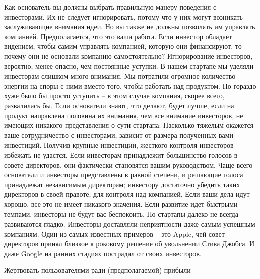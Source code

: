 \documentclass[ebook,12pt,oneside,openany]{memoir}
\begin{document}
Как основатель вы должны выбрать правильную манеру поведения с
инвесторами. Их не следует игнорировать, потому что у них могут
возникать заслуживающие внимания идеи. Но вы также не должны позволять
им управлять компанией. Предполагается, что это ваша работа. Если
инвестор обладает видением, чтобы самим управлять компанией, которую
они финансируют, то почему они не основали компанию самостоятельно?
Игнорирование инвесторов, вероятно, менее опасно, чем постоянные
уступки. В нашем стартапе мы уделяли инвесторам слишком много
внимания. Мы потратили огромное количество энергии на споры с ними
вместо того, чтобы работать над продуктом. Но гораздо хуже было бы
просто уступить – в этом случае компания, скорее всего, развалилась
бы. Если основатели знают, что делают, будет лучше, если на продукт
направлена половина их внимания, чем все внимание инвесторов, не
имеющих никакого представления о сути стартапа. Насколько тяжелым
окажется ваше сотрудничество с инвесторами, зависит от размера
полученных вами инвестиций. Получив крупные инвестиции, жесткого
контроля инвесторов избежать не удастся. Если инвесторам принадлежит
большинство голосов в совете директоров, они фактически становятся
вашим руководством. Чаще всего основатели и инвесторы представлены в
равной степени, и решающие голоса принадлежат независимым директорам;
инвестору достаточно убедить таких директоров в своей правоте, для
контроля над компанией. Если ваши дела идут хорошо, все это не имеет
никакого значения. Если развитие идет быстрыми темпами, инвесторы не
будут вас беспокоить. Но стартапы далеко не всегда развиваются гладко.
Инвесторы доставляли неприятности даже самым успешным компаниям. Один
из самых известных примеров – это Apple, чей совет директоров принял
близкое к роковому решение об увольнении Стива Джобса. И даже Google
на ранних стадиях пострадал от своих инвесторов.

Жертвовать пользователями ради (предполагаемой) прибыли
\end{document}
